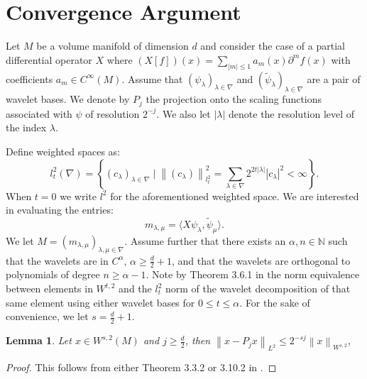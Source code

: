\documentclass[12pt]{amsart}
\title{}
\author{}
\date{} %
\newtheorem{lemma}{Lemma}
\newcommand{\N}{\mathbb{N}}
\newcommand{\card}[1]{{\lvert#1\rvert}}
\newcommand{\abs}[1]{\ensuremath{\left\lvert #1\right\rvert}}
\newcommand{\norm}[1]{\ensuremath{\left\lVert #1\right\rVert}}
\begin{document}
\section{Convergence Argument}

Let $M$ be a volume manifold of dimension $d$ and consider the case of a partial differential operator $X$ where $(X [f] )(x) = \sum_{\abs{m}\leq 1} a_m(x) \partial^m f(x)$ with coefficients $a_m \in C^{\infty}(M)$. Assume that $(\psi_\lambda)_{\lambda \in \nabla}$ and $(\tilde{\psi}_\lambda)_{\lambda \in \nabla}$ are a pair of wavelet bases. We denote by $P_j$ the projection onto the scaling functions associated with $\psi$ of resolution $2^{-j}$. We also let $\card{\lambda}$ denote the resolution level of the index $\lambda$. 

Define weighted spaces as:
\begin{equation}
	l_t^2(\nabla) = \left\{ (c_\lambda)_{\lambda\in\nabla} \mid \norm{(c_\lambda)}_{l^2_t}^2 = \sum_{\lambda \in \nabla} 2^{2t\card{\lambda}}\abs{c_\lambda}^2 < \infty  \right\}.
\end{equation}
When $t = 0$ we write $l^2$ for the aforementioned weighted space. We are interested in evaluating the entries:
\begin{equation}
	m_{\lambda,\mu} = \langle X \psi_\lambda, \tilde{\psi}_\mu \rangle.
\end{equation}
We let $M=(m_{\lambda,\mu})_{\lambda,\mu \in \nabla}$. Assume further that there exists an $\alpha,n \in \N$ such that the wavelets are in $C^{\alpha}$, $\alpha \geq \frac{d}{2} + 1$, and that the wavelets are orthogonal to polynomials of degree $n \geq \alpha - 1$.  Note by Theorem 3.6.1 in \cite{Cohen2003} the norm equivalence between elements in $W^{t,2}$ and the $l_t^2$ norm of the wavelet decomposition of that same element using either wavelet bases for $0\leq t \leq \alpha$. For the sake of convenience, we let $s = \frac{d}{2} + 1$. 

\begin{lemma} \label{lem:projection_bound}
	Let $x \in W^{s,2}(M)$ and $j \geq \frac{d}{2}$, then $\norm{x - P_j x}_{L^2} \leq  2^{-sj}\norm{x}_{W^{s,2}}$,
\end{lemma}
\begin{proof}
	This follows from either Theorem 3.3.2 or 3.10.2 in \cite{}.
\end{proof}
\end{document}
